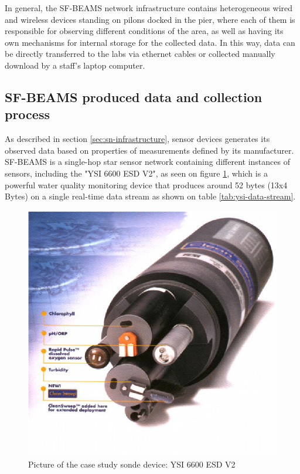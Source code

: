 In general, the SF-BEAMS network infrastructure contains heterogeneous wired and
wireless devices standing on pilons docked in the pier, where each of them is
responsible for observing different conditions of the area, as well as having
its own mechanisms for internal storage for the collected data. In this way,
data can be directly transferred to the labs via ethernet cables or collected
manually download by a staff's laptop computer.

\subsection{SF-BEAMS produced data and collection process}
\label{sec:sfbeams}

As described in section \ref{sec:sn-infrastructure}, sensor devices generates
its observed data based on properties of measurements defined by its
manufacturer. SF-BEAMS is a single-hop star sensor network containing
different instances of sensors, including the "YSI 6600 ESD V2", as seen on
figure \ref{fig:ysi-device}, which is a powerful water quality monitoring
device that produces around 52 bytes (13x4 Bytes) on a single real-time data
stream as shown on table \ref{tab:ysi-data-stream}.

\begin{figure}[!b]
  \centering
  \includegraphics[scale=0.7]{../diagrams/ysi-device}
  \caption{Picture of the case study sonde device: YSI 6600 ESD V2}
  \label{fig:ysi-device}
\end{figure}

